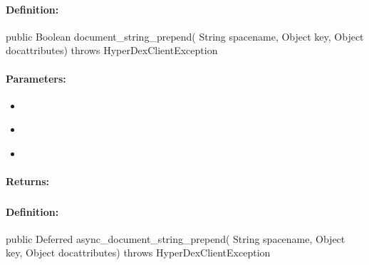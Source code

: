 \paragraph{Definition:}
\begin{javacode}
public Boolean document_string_prepend(
        String spacename,
        Object key,
        Object docattributes) throws HyperDexClientException
\end{javacode}

\paragraph{Parameters:}
\begin{itemize}[noitemsep]
\item {}\\

\item {}\\

\item {}\\

\end{itemize}

\paragraph{Returns:}


\pagebreak
\subsubsection{}
\label{api:java:async_document_string_prepend}


\paragraph{Definition:}
\begin{javacode}
public Deferred async_document_string_prepend(
        String spacename,
        Object key,
        Object docattributes) throws HyperDexClientException
\end{javacode}

